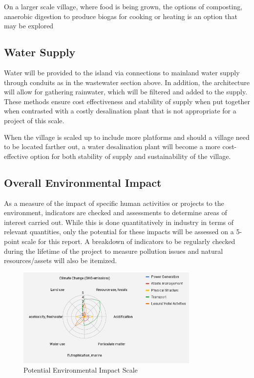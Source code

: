 \documentclass[11pt]{article}
\numberwithin{equation}{section}
\begin{document}
On a larger scale village, where food is being grown, the options of composting, anaerobic digestion to produce biogas for cooking or heating is an option that may be explored

\subsection{Water Supply}
\label{sec:org80b4a77}
Water will be provided to the island via connections to mainland water supply through conduits as in the wastewater section above. In addition, the architecture will allow for gathering rainwater, which will be filtered and added to the supply. These methods ensure cost effectiveness and stability of supply when put together when contrasted with a costly desalination plant that is not appropriate for a project of this scale.

When the village is scaled up to include more platforms and should a village need to be located farther out, a water desalination plant will become a more cost-effective option for both stability of supply and sustainability of the village.

\subsection{Overall Environmental Impact}
\label{sec:org7552295}
As a measure of the impact of specific human activities or projects to the environment, indicators are checked and assessments to determine areas of interest carried out. While this is done quantitatively in industry in terms of relevant quantities, only the potential for these impacts will be assessed on a 5-point scale for this report. A breakdown of indicators to be regularly checked during the lifetime of the project to measure pollution issues and natural resources/assets will also be itemized.

\begin{figure}[H]
\centering
\includegraphics[width=0.8\textwidth]{Figures/PotentialEnvironmentalImpactScale.png}
\caption{\label{PotentialEnvironmentalImpactScale}Potential Environmental Impact Scale}
\end{figure}
\end{document}
